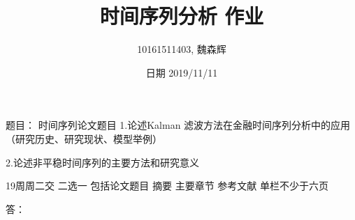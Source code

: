 \documentclass[12pt, a4paper]{ctexart}
\title{时间序列分析 作业}
\author{10161511403, 魏森辉}
\date{日期 2019/11/11}
\begin{document}
\maketitle{}

\begin{flushleft}
\qquad 题目：
时间序列论文题目
1.论述Kalman 滤波方法在金融时间序列分析中的应用
（研究历史、研究现状、模型举例）

2.论述非平稳时间序列的主要方法和研究意义

19周周二交
二选一
包括论文题目 摘要 主要章节 参考文献
单栏不少于六页

\qquad 答：

\end{flushleft}
\end{document}
